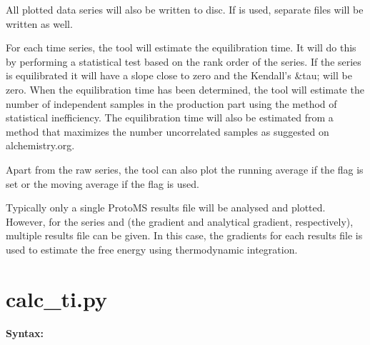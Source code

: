 \documentclass[letterpaper,10pt,english]{sphinxmanual}
\begin{document}
All plotted data series will also be written to disc. If  is used, separate files will be written as well.

For each time series, the tool will estimate the equilibration time. It will do this by performing a statistical test based on the rank order of the series. If the series is equilibrated it will have a slope close to zero and the Kendall's \&tau; will be zero. When the equilibration time has been determined, the tool will estimate the number of independent samples in the production part using the method of statistical inefficiency. The equilibration time will also be estimated from a method that maximizes the number uncorrelated samples as suggested on alchemistry.org.

Apart from the raw series, the tool can also plot the running average if the  flag is set or the moving average if the  flag is used.

Typically only a single ProtoMS results file will be analysed and plotted. However, for the series  and  (the gradient and analytical gradient, respectively), multiple results file can be given. In this case, the gradients for each results file is used to estimate the free energy using thermodynamic integration.


\section{calc\_ti.py}
\label{tools:calc-ti-py}
\textbf{Syntax:}
\end{document}
